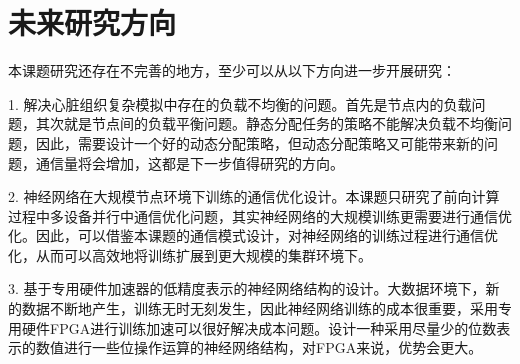 \section{未来研究方向}
本课题研究还存在不完善的地方，至少可以从以下方向进一步开展研究：
\begin{compactitem}
\item[1.]解决心脏组织复杂模拟中存在的负载不均衡的问题。首先是节点内的负载问题，其次就是节点间的负载平衡问题。静态分配任务的策略不能解决负载不均衡问题，因此，需要设计一个好的动态分配策略，但动态分配策略又可能带来新的问题，通信量将会增加，这都是下一步值得研究的方向。

\item[2.]神经网络在大规模节点环境下训练的通信优化设计。本课题只研究了前向计算过程中多设备并行中通信优化问题，其实神经网络的大规模训练更需要进行通信优化。因此，可以借鉴本课题的通信模式设计，对神经网络的训练过程进行通信优化，从而可以高效地将训练扩展到更大规模的集群环境下。

\item[3.]基于专用硬件加速器的低精度表示的神经网络结构的设计。大数据环境下，新的数据不断地产生，训练无时无刻发生，因此神经网络训练的成本很重要，采用专用硬件FPGA进行训练加速可以很好解决成本问题。设计一种采用尽量少的位数表示的数值进行一些位操作运算的神经网络结构，对FPGA来说，优势会更大。

\end{compactitem}


